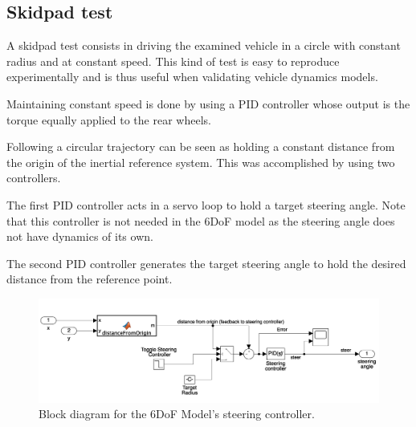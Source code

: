 \subsection{Skidpad test}
A skidpad test consists in driving the examined vehicle in a circle with constant radius and at constant speed. This kind of test is easy to reproduce experimentally and is thus useful when validating vehicle dynamics models.

Maintaining constant speed is done by using a PID controller whose output is the torque equally applied to the rear wheels.

Following a circular trajectory can be seen as holding a constant distance from the origin of the inertial reference system. This was accomplished by using two controllers.

The first PID controller acts in a servo loop to hold a target steering angle.
Note that this controller is not needed in the 6DoF model as the steering angle does not have dynamics of its own.

The second PID controller generates the target steering angle to hold the desired distance from the reference point.

\begin{figure}[h]
    \centering
    \includegraphics[width=\textwidth]{images/steercontrol}
    \caption{Block diagram for the 6DoF Model's steering controller.}
	\label{12mask}
\end{figure}
